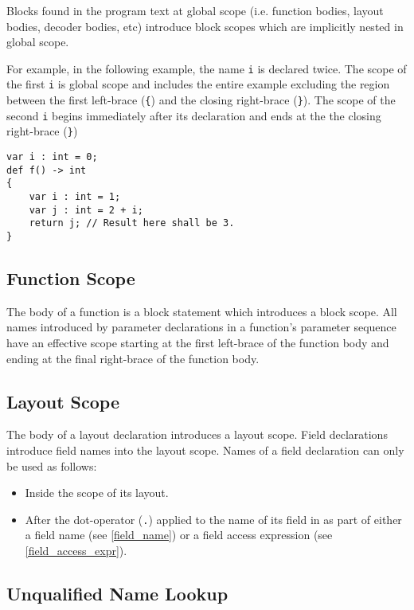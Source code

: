 Blocks found in the program text at global scope (i.e. function bodies, layout bodies, decoder bodies, etc) introduce block scopes which are implicitly nested in global scope.

For example, in the following example, the name \texttt{i} is declared twice. The scope of the first \texttt{i} is global scope and includes the entire example excluding the region between the first left-brace (\texttt{\{}) and the closing right-brace (\texttt{\}}). The scope of the second \texttt{i} begins immediately after its declaration and ends at the the closing right-brace (\texttt{\}})

\noindent\begin{minipage}{\linewidth}
\begin{lstlisting}
var i : int = 0;
def f() -> int
{
	var i : int = 1;
	var j : int = 2 + i;
	return j; // Result here shall be 3.
}
\end{lstlisting}
\end{minipage}

\subsection{Function Scope} \label{function_scope}

The body of a function is a block statement which introduces a block scope. All names introduced by parameter declarations in a function's parameter sequence have an effective scope starting at the first left-brace of the function body and ending at the final right-brace of the function body.

\subsection{Layout Scope} \label{layout_scope}

The body of a layout declaration introduces a layout scope. Field declarations introduce field names into the layout scope. Names of a field declaration can only be used as follows:

\begin{itemize}
\item Inside the scope of its layout.
\item After the dot-operator (\texttt{.}) applied to the name of its field in as part of either a field name (see \ref{field_name}) or a field access expression (see \ref{field_access_expr}).
\end{itemize}

\subsection{Unqualified Name Lookup} \label{unqlfd_lookup}

